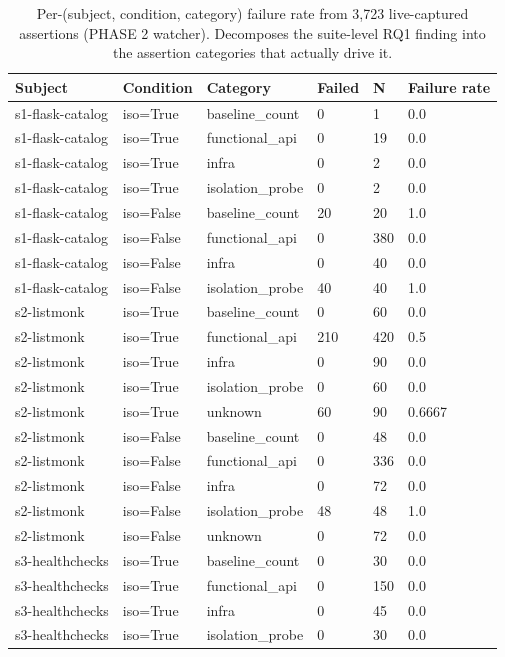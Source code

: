 \begin{table}[t]
\centering
\caption{Per-(subject, condition, category) failure rate from 3,723 live-captured assertions (PHASE 2 watcher). Decomposes the suite-level RQ1 finding into the assertion categories that actually drive it.}
\label{tab:T1_assertion_by_category}
\begin{tabular}{llllll}
\hline
Subject & Condition & Category & Failed & N & Failure rate \\
\hline
s1-flask-catalog & iso=True & baseline\_count & 0 & 1 & 0.0 \\
s1-flask-catalog & iso=True & functional\_api & 0 & 19 & 0.0 \\
s1-flask-catalog & iso=True & infra & 0 & 2 & 0.0 \\
s1-flask-catalog & iso=True & isolation\_probe & 0 & 2 & 0.0 \\
s1-flask-catalog & iso=False & baseline\_count & 20 & 20 & 1.0 \\
s1-flask-catalog & iso=False & functional\_api & 0 & 380 & 0.0 \\
s1-flask-catalog & iso=False & infra & 0 & 40 & 0.0 \\
s1-flask-catalog & iso=False & isolation\_probe & 40 & 40 & 1.0 \\
s2-listmonk & iso=True & baseline\_count & 0 & 60 & 0.0 \\
s2-listmonk & iso=True & functional\_api & 210 & 420 & 0.5 \\
s2-listmonk & iso=True & infra & 0 & 90 & 0.0 \\
s2-listmonk & iso=True & isolation\_probe & 0 & 60 & 0.0 \\
s2-listmonk & iso=True & unknown & 60 & 90 & 0.6667 \\
s2-listmonk & iso=False & baseline\_count & 0 & 48 & 0.0 \\
s2-listmonk & iso=False & functional\_api & 0 & 336 & 0.0 \\
s2-listmonk & iso=False & infra & 0 & 72 & 0.0 \\
s2-listmonk & iso=False & isolation\_probe & 48 & 48 & 1.0 \\
s2-listmonk & iso=False & unknown & 0 & 72 & 0.0 \\
s3-healthchecks & iso=True & baseline\_count & 0 & 30 & 0.0 \\
s3-healthchecks & iso=True & functional\_api & 0 & 150 & 0.0 \\
s3-healthchecks & iso=True & infra & 0 & 45 & 0.0 \\
s3-healthchecks & iso=True & isolation\_probe & 0 & 30 & 0.0 \\

\end{tabular}
\end{table}

